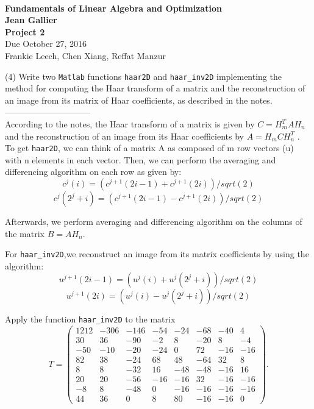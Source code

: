\documentclass[12pt]{article}
\begin{document}
\begin{center}
\\
\vspace{1cm}
{\Large\bf Fundamentals of Linear Algebra and Optimization\\
Jean Gallier \\
\vspace{0.5cm}
Project 2}\\[10pt]
Due October 27, 2016\\
Frankie Leech, Chen Xiang, Reffat Manzur\\
\end{center}

\vspace{0.5cm}

\medskip
(4)
Write two {\tt Matlab} functions {\tt haar2D} and {\tt haar\_inv2D}
implementing the method for computing the Haar transform
of a  matrix and the reconstruction of an image from its matrix of Haar
coefficients, as described in the notes.\\------------------------------\\
According to the notes, the Haar transform of a matrix is given by $C = H_m^T A H_n$ and the reconstruction of an image from its Haar coefficients by $A = H_m C H_n^T$ . To get {\tt haar2D}, we can think of a matrix A as    composed of m row vectors (u) with n elements in each vector. Then, we can perform the averaging and differencing algorithm on each row as given by:
$$c^j(i) = (c^{j+1}(2i -1) + c^{j+1}(2i))/sqrt(2)$$  
$$c^j(2^j+i) = (c^{j+1}(2i -1) - c^{j+1}(2i))/sqrt(2)$$ 

Afterwards, we perform averaging and differencing algorithm on the columns of the matrix $B=A H_n$.


For {\tt haar\_inv2D},we reconstruct an image from its matrix coefficients by using the algorithm: 
$$u^{j+1}(2i-1) = (u^{j}(i) + u^{j}(2^j+i))/sqrt(2)$$  
$$u^{j+1}(2i) = (u^{j}(i) - u^{j}(2^j+i))/sqrt(2)$$




\medskip
Apply the function {\tt haar\_inv2D} to the matrix
\[
T = 
\begin{pmatrix}
1212 & -306 & -146 & -54 & -24 & -68 & -40 & 4 \\
    30 & 36 & -90 & -2 &  8 & -20 & 8  & -4 \\
    -50 & -10 & -20 & -24 & 0 & 72 & -16 & -16 \\
    82 & 38 & -24 & 68 & 48 & -64 & 32 & 8 \\
    8 & 8 & -32 & 16 & -48 & -48 & -16 & 16 \\
    20 & 20 & -56 & -16 & -16 & 32 & -16 & -16 \\
    -8 & 8 & -48 & 0 & -16 & -16 & -16 &  -16 \\
    44 & 36 & 0 & 8 & 80 & -16 & -16 & 0
\end{pmatrix}.
\]
\end{document}
